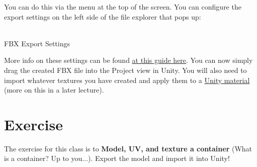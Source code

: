 \documentclass[11pt]{article}
\begin{document}
You can do this via the menu  at the top of the screen.  You can
configure the export settings on the left side of the file explorer that pops up:
\begin{center}
    \\
    FBX Export Settings
\end{center}
More info on these settings can be found 
\href{https://digitalrune.github.io/DigitalRune-Documentation/html/6f749972-9cb2-4274-b283-c327ba45e379.htm}{at this guide here}.
You can now simply drag the created FBX file into the Project view in Unity.  You will also need to
import whatever textures you have created and apply them to a 
\href{https://docs.unity3d.com/Manual/Materials.html}{Unity material} (more on this in a later lecture).

\section{Exercise}

The exercise for this class is to \textbf{Model, UV, and texture a container} (What is a container?
Up to you$\dots$).  Export the model and import it into Unity!
\end{document}
